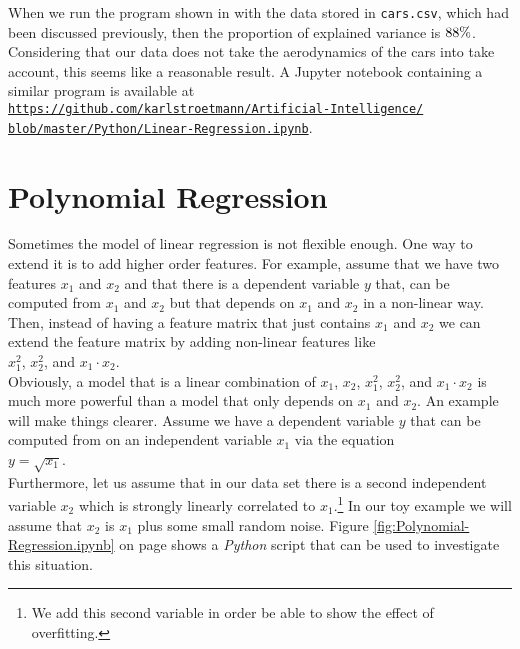When we run the program shown in  with the data stored in \texttt{cars.csv},
which had been discussed previously, then the proportion of explained variance is $88 \mathtt{\symbol{37}}$.  Considering that our data does
not take the aerodynamics of the cars into take account, this seems like a reasonable result.  A Jupyter notebook
containing a similar program is available at
\\[0.2cm]
\hspace*{1.3cm}
\href{https://github.com/karlstroetmann/Artificial-Intelligence/blob/master/Python/Linear-Regression.ipynb}{\texttt{https://github.com/karlstroetmann/Artificial-Intelligence/\\
\hspace*{2.2cm}
 blob/master/Python/Linear-Regression.ipynb}}.

\section{Polynomial Regression}
Sometimes the model of linear regression is not flexible enough.  One way to extend it is to add higher order
features.  For example, assume that we have two features $x_1$ and $x_2$ and that there is a dependent variable
$y$ that,  can be computed from $x_1$ and $x_2$ but that depends on $x_1$ and $x_2$ in a non-linear way.
Then, instead of having a feature matrix that just contains $x_1$ and $x_2$ we can extend the feature matrix by
adding non-linear features like
\\[0.2cm]
\hspace*{1.3cm}
$x_1^2$, $x_2^2$, and $x_1 \cdot x_2$.
\\[0.2cm]
Obviously, a model that is a linear combination of $x_1$, $x_2$, $x_1^2$, $x_2^2$, and $x_1 \cdot x_2$ is much
more powerful than a model that only depends on $x_1$ and $x_2$.  An example will make things clearer.
Assume we have a dependent variable $y$ that can be computed from on an independent variable $x_1$ via the
equation
\\[0.2cm]
\hspace*{1.3cm}
$y = \sqrt{x_1}$.
\\[0.2cm]
Furthermore, let us assume that in our data set there is a second independent variable $x_2$ which is strongly
linearly correlated to $x_1$.\footnote{
  We add this second variable in order be able to show the effect of overfitting.
}
In our toy example we will assume that $x_2$ is $x_1$ plus some small random noise.
Figure \ref{fig:Polynomial-Regression.ipynb} on page \pageref{fig:Polynomial-Regression.ipynb} shows a
\textsl{Python} script that can be used to investigate this situation.



